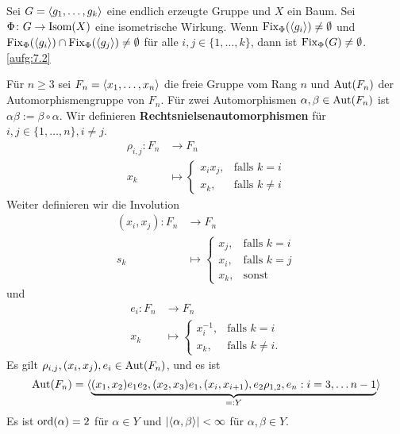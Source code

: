 \begin{satz}[Verallgemeinerung]
\label{satz:3.9}
	Sei $G = \langle g_1,\dots,g_k\rangle$ eine endlich erzeugte Gruppe und $X$ ein Baum.
	Sei $\Phi\colon G \rightarrow \operatorname{Isom}(X)$ eine isometrische Wirkung.
	Wenn $\operatorname{Fix}_\Phi(\langle g_i\rangle) \neq \emptyset$ und $\operatorname{Fix}_\Phi(\langle g_i\rangle) \cap \operatorname{Fix}_\Phi(\langle g_j\rangle) \neq \emptyset$ für alle $i,j \in \{1,\dots,k\}$, dann ist $\operatorname{Fix}_\Phi(G) \neq \emptyset$. \autoref{aufg:7.2}
\end{satz}

\begin{no-bsp}
\label{bsp:3.10}
	Für $n \geq 3$ sei $F_n = \langle x_1, \dots, x_n\rangle$ die freie Gruppe vom Rang $n$ und $\operatorname{Aut}(F_n)$ der Automorphismengruppe von $F_n$. 
	Für zwei Automorphismen $\alpha, \beta \in \operatorname{Aut}(F_n)$ ist $\alpha \beta := \beta \circ \alpha$.
	Wir definieren \textbf{Rechtsnielsenautomorphismen} für $i,j \in \{1, \dots, n\}, i \neq j$.
	\begin{align*}
		\rho_{i,j} \colon F_n &\longrightarrow F_n \\
		x_k &\longmapsto \begin{cases}
			x_ix_j, & \text{falls } k=i \\
			x_k, & \text{falls } k \neq i
		\end{cases}
	\end{align*}
	Weiter definieren wir die Involution
	\begin{align*}
		(x_i,x_j)\colon F_n &\longrightarrow F_n \\
			s_k &\longmapsto \begin{cases}
				x_j, & \text{falls } k=i \\
				x_i, & \text{falls } k=j \\
				x_k, & \text{sonst}
			\end{cases}
	\end{align*}
	und
	\begin{align*}
		e_i \colon F_n &\longrightarrow F_n \\
		x_k &\longmapsto \begin{cases}
			x_i^{-1}, & \text{falls } k = i \\
			x_k, &\text{falls } k \neq i.
		\end{cases}
	\end{align*}
	Es gilt $\rho_{i,j}, (x_i,x_j), e_i \in \operatorname{Aut}(F_n)$, und es ist
	\[
		\operatorname{Aut}(F_n) = \langle{\underbrace{(x_1,x_2)e_1e_2, (x_2,x_3)e_1, (x_i,x_{i+1}), e_2\rho_{1,2},e_n : i = 3, \dots n-1}_{=:Y}}\rangle
	\]
	Es ist $\operatorname{ord}(\alpha) = 2$ für $\alpha \in Y$ und $\lvert\langle\alpha,\beta\rangle\rvert < \infty$ für $\alpha,\beta \in Y$.
	

\end{no-bsp}
